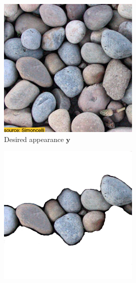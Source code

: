 \begin{figure}[]
    \centering    
    \begin{subfigure}{\textwidth}
        \centering
        \begin{subfigure}{0.24\textwidth}
            \centering
            \includegraphics[width=\textwidth]{images/04-experiment01/pebbles/target.jpg}
            \caption{Desired appearance \(\bm{y}\)}
            \label{fig:ex01-pebbles-5steps-some_target}
        \end{subfigure}
        \hfill
        \begin{subfigure}{0.24\textwidth}
            \centering
            \includegraphics[width=\textwidth]{images/04-experiment01/pebbles/some_bg.jpg}

\end{subfigure}
\end{subfigure}
\end{figure}
